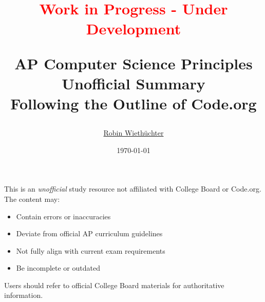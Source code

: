 \documentclass[11pt,oneside]{book}
\title{
    \normalsize\textcolor{red}{Work in Progress - Under Development}

    \Huge AP Computer Science Principles\\[0.5em]

    \Huge Unofficial Summary\\[0.2em]
    
    \Large Following the Outline of Code.org\\[0.5em]
}
\author{\href{https://rowi.dev/}{Robin Wiethüchter}}
\date{\today}
\begin{document}
\maketitle

\begin{tcolorbox}[
    title=Disclaimer,
    colback=white,
    colframe=black,
    width=\textwidth-2cm,
    center
]
This is an \textit{unofficial} study resource not affiliated with College Board\textsuperscript{\textregistered} or Code.org\textsuperscript{\textregistered}. The content may:
\begin{itemize}[leftmargin=*,noitemsep]
    \item Contain errors or inaccuracies
    \item Deviate from official AP\textsuperscript{\textregistered} curriculum guidelines
    \item Not fully align with current exam requirements
    \item Be incomplete or outdated
\end{itemize}
Users should refer to official College Board\textsuperscript{\textregistered} materials for authoritative information.
\end{tcolorbox}

\tableofcontents



% 

% 
% 
% 
% 
% 
% 

% 
% 
\end{document}
